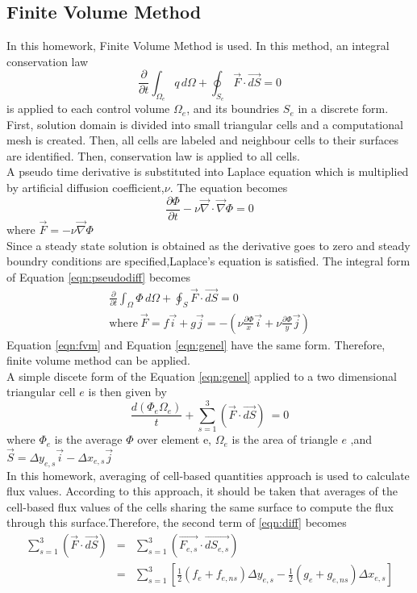 \documentclass[letterpaper,12pt]{article}
\begin{document}
\subsection{Finite Volume Method} 
In this homework, Finite Volume Method is used. In this method, an integral conservation law
\begin{equation}
        \frac{\partial}{\partial t}\int_{\Omega_e} q\,d\Omega + \oint_{S_e} \vec{F} \cdot \vec{dS} =0     
        \label{eqn:fvm}
\end{equation}
is applied to each control volume $\Omega_e$, and its boundries $S_e$ in a discrete form. First, solution domain is divided into small triangular cells and a computational mesh is created. 
Then, all cells are labeled and neighbour cells to their surfaces are identified. Then, conservation law is applied to all cells.\\
A pseudo time derivative is substituted into Laplace equation which is multiplied by artificial 
diffusion coefficient,$\nu$. The equation becomes
\begin{equation}
        \frac{\partial \Phi}{\partial t} - \nu \vec{\nabla}\cdot\vec{\nabla}\Phi = 0
        \label{eqn:pseudodiff}
\end{equation}
where $\vec{F}=-\nu\vec{\nabla}\Phi$\\
Since a steady state solution is obtained as the derivative goes to zero and steady boundry conditions 
are specified,Laplace’s equation is satisfied. 
The integral form of Equation \ref{eqn:pseudodiff} becomes
\begin{eqnarray}
        \frac{\partial}{\partial t}\int_{\Omega} \Phi\,d\Omega + \oint_S \vec{F} \cdot \vec{dS} =0\ \\
        \mbox{where}\: \vec{F}=f\vec{i}+g\vec{j}=-(\nu\frac{\partial \Phi}{x}\vec{i}+\nu\frac{\partial \Phi}{y}\vec{j})\nonumber
        \label{eqn:genel}
\end{eqnarray}
Equation \ref{eqn:fvm} and Equation \ref{eqn:genel} have the same form. Therefore, finite volume method can be applied.\\
A simple discete form of the Equation \ref{eqn:genel} applied to a two dimensional triangular cell $e$ is then given by
\begin{equation}
        \frac{d(\Phi_e\Omega_e)}{t}+\sum_{s=1}^{3} (\vec{F} \cdot \vec{dS})\ =0
        \label{eqn:diff}
\end{equation}
where $\Phi_e$ is the average $\Phi$ over element e, $\Omega_e$ is the area of triangle $e$ ,and
$\vec{S} = \Delta y_{e,s}\vec{i}-\Delta x_{e,s}\vec{j}$\\
In this homework, averaging of cell-based quantities approach is used to calculate flux values. According to this approach,
it should be taken that averages of the cell-based flux values of the cells sharing the same surface to compute the flux 
through this surface.Therefore, the second term of \ref{eqn:diff} becomes
\begin{eqnarray}
	\sum_{s=1}^{3} (\vec{F} \cdot \vec{dS})&=&\sum_{s=1}^{3} (\vec{F_{e,s}} \cdot \vec{dS_{e,s}}) \nonumber \\
	&=&\sum_{s=1}^{3}[\frac{1}{2}(f_{e}+f_{e,ns})\Delta y_{e,s}-\frac{1}{2}(g_{e}+g_{e,ns})\Delta x_{e,s}] 
\end{eqnarray}
\end{document}
